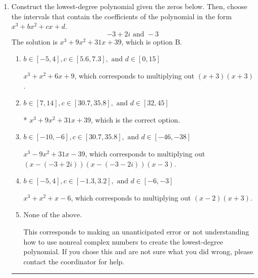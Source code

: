 \documentclass{extbook}[14pt]
\newcommand{\litem}[1]{\item #1

\rule{\textwidth}{0.4pt}}
\begin{document}
\begin{enumerate}\litem{
Construct the lowest-degree polynomial given the zeros below. Then, choose the intervals that contain the coefficients of the polynomial in the form $x^3+bx^2+cx+d$.
\[ -3 + 2 i \text{ and } -3 \]The solution is \( x^{3} +9 x^{2} +31 x + 39 \), which is option B.\begin{enumerate}[label=\Alph*.]
\item \( b \in [-5, 4], c \in [5.6, 7.3], \text{ and } d \in [0, 15] \)

$x^{3} + x^{2} +6 x + 9$, which corresponds to multiplying out $(x + 3)(x + 3)$.
\item \( b \in [7, 14], c \in [30.7, 35.8], \text{ and } d \in [32, 45] \)

* $x^{3} +9 x^{2} +31 x + 39$, which is the correct option.
\item \( b \in [-10, -6], c \in [30.7, 35.8], \text{ and } d \in [-46, -38] \)

$x^{3} -9 x^{2} +31 x -39$, which corresponds to multiplying out $(x-(-3 + 2 i))(x-(-3 - 2 i))(x -3)$.
\item \( b \in [-5, 4], c \in [-1.3, 3.2], \text{ and } d \in [-6, -3] \)

$x^{3} + x^{2} +x -6$, which corresponds to multiplying out $(x -2)(x + 3)$.
\item \( \text{None of the above.} \)

This corresponds to making an unanticipated error or not understanding how to use nonreal complex numbers to create the lowest-degree polynomial. If you chose this and are not sure what you did wrong, please contact the coordinator for help.
\end{enumerate}

}
\end{enumerate}
\end{document}
